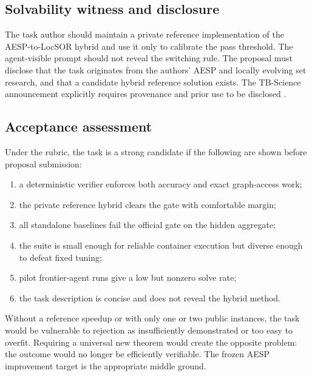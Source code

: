 \subsection{Solvability witness and disclosure}

The task author should maintain a private reference implementation of the
AESP-to-LocSOR hybrid and use it only to calibrate the pass threshold.  The
agent-visible prompt should not reveal the switching rule.  The proposal must
disclose that the task originates from the authors' AESP and locally evolving
set research, and that a candidate hybrid reference solution exists.  The
TB-Science announcement explicitly requires provenance and prior use to be
disclosed \citep{tbscience2026announcement}.

\subsection{Acceptance assessment}

Under the rubric, the task is a strong candidate if the following are shown
before proposal submission:
\begin{enumerate}[leftmargin=2em]
\item a deterministic verifier enforces both accuracy and exact graph-access
      work;
\item the private reference hybrid clears the gate with comfortable margin;
\item all standalone baselines fail the official gate on the hidden aggregate;
\item the suite is small enough for reliable container execution but diverse
      enough to defeat fixed tuning;
\item pilot frontier-agent runs give a low but nonzero solve rate;
\item the task description is concise and does not reveal the hybrid method.
\end{enumerate}
Without a reference speedup or with only one or two public instances, the task
would be vulnerable to rejection as insufficiently demonstrated or too easy
to overfit.  Requiring a universal new theorem would create the opposite
problem: the outcome would no longer be efficiently verifiable.  The frozen
AESP improvement target is the appropriate middle ground.
